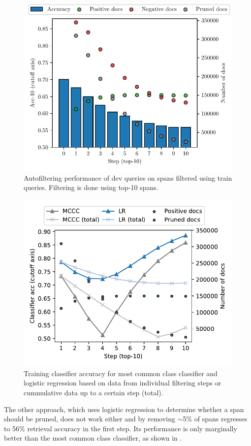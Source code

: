 \begin{figure}[ht]
    \center
    \includegraphics[width=0.8\linewidth]{img/autofilter_train_dev.pdf}
    \caption{Autofiltering performance of dev queries on spans filtered using train queries. Filtering is done using top-10 spans.}
    \label{fig:autofilter_train_dev}
\end{figure}


\begin{figure}[ht]
    \center
    \includegraphics[width=0.8\linewidth]{img/autofilter_classifier.pdf}
    \caption{Training classifier accuracy for most common class classifier and logistic regression based on data from individual filtering steps or cummulative data up to a certain step (total).}
    \label{fig:autofilter_classifier}
\end{figure}

The other approach, which uses logistic regression to determine whether a span should be pruned, does not work either and by removing $\sim$5\% of spans regresses to 56\% retrieval accuracy in the first step.
Its performance is only marginally better than the most common class classifier, as shown in .

